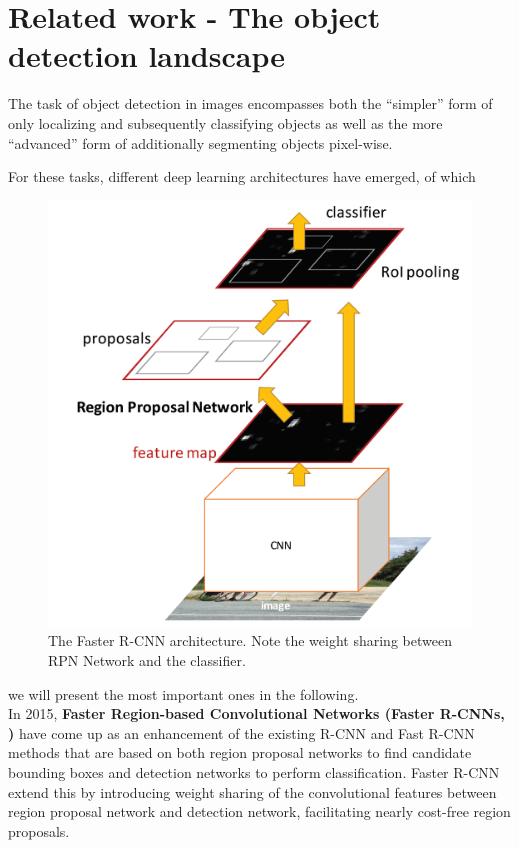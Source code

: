 \documentclass[a4paper]{article}
\begin{document}
\section{Related work - The object detection landscape}
The task of object detection in images encompasses both the ``simpler'' form of only localizing and subsequently classifying objects as well as the more ``advanced'' form of additionally segmenting objects pixel-wise. 

For these tasks, different deep learning architectures have emerged, of which \begin{figure}
\includegraphics[scale=0.38]{FRCN_architecture}
\caption{The Faster R-CNN architecture. Note the weight sharing between RPN Network and the classifier.}
\end{figure} we will present the most important ones in the following.\\ In 2015, \textbf{Faster Region-based Convolutional Networks (Faster R-CNNs, \cite{DBLP:journals/corr/RenHG015})} have come up as an enhancement  of the existing R-CNN and Fast R-CNN methods that are based on both region proposal networks to find candidate bounding boxes and detection networks to perform classification. Faster R-CNN extend this by introducing weight sharing of the convolutional features between region proposal network and detection network, facilitating nearly cost-free region proposals. 
\end{document}
